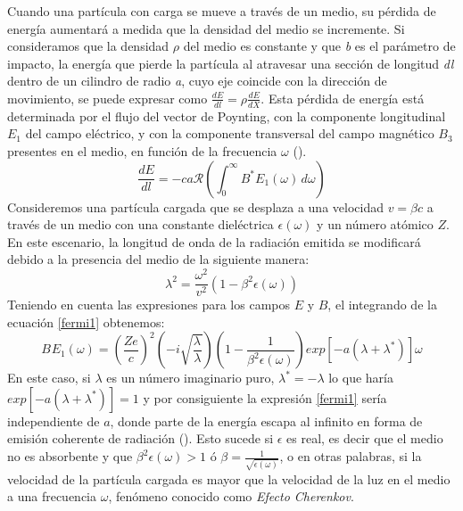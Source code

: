 Cuando una partícula con carga se mueve a través de un medio, su pérdida de energía aumentará a medida que la densidad del medio se incremente. Si consideramos que la densidad $\rho$ del medio es constante y que \textit{b} es el parámetro de impacto, la energía que pierde la partícula al atravesar una sección de longitud \textit{dl} dentro de un cilindro de radio \textit{a}, cuyo eje coincide con la dirección de movimiento, se puede expresar como $\frac{dE}{dl} = \rho \frac{dE}{dX}$. Esta pérdida de energía está determinada por el flujo del vector de Poynting, con la componente longitudinal $E_{1}$ del campo eléctrico, y con la componente transversal del campo magnético $B_{3}$ presentes en el medio, en función de la frecuencia $\omega$ (\cite{fermi_1940}).
\begin{equation}
    \frac{dE}{dl} = -ca \mathcal{R}\left(\int_{0}^{\infty} B^{*}E_{1}(\omega) \, d\omega\right)
    \label{fermi1}
\end{equation}
Consideremos una partícula cargada que se desplaza a una velocidad $v=\beta c$ a través de un medio con una constante dieléctrica $\epsilon(\omega)$ y un número atómico $Z$. En este escenario, la longitud de onda de la radiación emitida se modificará debido a la presencia del medio de la siguiente manera:
\begin{equation}
\lambda^{2}=\frac{\omega^{2}}{v^{2}}(1-\beta^{2}\epsilon(\omega))
\label{lamdamod}
\end{equation}
Teniendo en cuenta las expresiones para los campos $E$ y $B$, el integrando de la ecuación \ref{fermi1} obtenemos:
\begin{equation}
B^{}E_{1}(\omega)=\left(\frac{Ze}{c}\right)^2 \left(-i\sqrt{\frac{\lambda^{}}{\lambda}}\right)\left(1-\frac{1}{\beta^{2}\epsilon(\omega)}\right)exp[-a(\lambda+\lambda^{*})]\omega
\end{equation}
En este caso, si $\lambda$ es un número imaginario puro, $\lambda^{*}=-\lambda$ lo que haría 
$exp[-a(\lambda+\lambda^{*})] = 1$ y por consiguiente la expresión \ref{fermi1} sería independiente de $a$, donde parte de la energía escapa al infinito en forma de emisión coherente de radiación (\cite{asorey}). Esto sucede si $\epsilon$ es real, es decir que el medio no es absorbente y que $\beta^{2}\epsilon(\omega)>1$ ó $\beta=\frac{1}{\sqrt{\epsilon(\omega)}}$, o en otras palabras, si la velocidad de la partícula cargada es mayor que la velocidad de la luz en el medio a una frecuencia $\omega$, fenómeno conocido como \textit{Efecto Cherenkov}.

